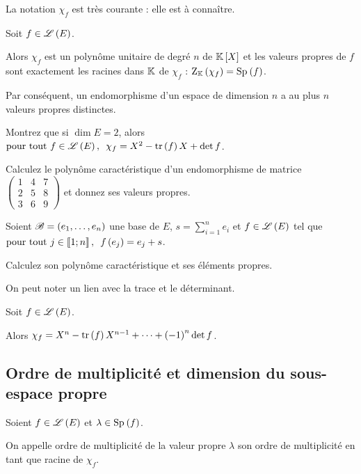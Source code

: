 La notation \(\chi_f\) est très courante : elle est à connaître.

\begin{theo}
Soit \(f\in\mathscr{L}\left(E\right)\).

Alors \(\chi_f\) est un polynôme unitaire de degré \(n\) de \(\poly\) et les valeurs propres de \(f\) sont exactement les racines dans \(\mathbb{K}\) de \(\chi_f\) : \(\rac{\chi_f}=\Sp{f}\).

Par conséquent, un endomorphisme d'un espace de dimension \(n\) a au plus \(n\) valeurs propres distinctes.
\end{theo}

\begin{exo}
Montrez que si \(\dim E=2\), alors \(\quantifs{\tpt f\in\Lendo{E}}\chi_f=X^2-\tr\paren{f}X+\det f\).
\end{exo}

\begin{exo}
Calculez le polynôme caractéristique d'un endomorphisme de matrice \(\begin{pmatrix}
1 & 4 & 7 \\
2 & 5 & 8 \\
3 & 6 & 9
\end{pmatrix}\) et donnez ses valeurs propres.
\end{exo}

\begin{exo}
Soient \(\mathscr{B}=\left(e_1,\dots,e_n\right)\) une base de \(E\), \(s=\sum_{i=1}^ne_i\) et \(f\in\mathscr{L}\left(E\right)\) tel que \(\quantifs{\tpt j\in\interventierii{1}{n}}f\paren{e_j}=e_j+s\).

Calculez son polynôme caractéristique et ses éléments propres.
\end{exo}

On peut noter un lien avec la trace et le déterminant.

\begin{prop}
Soit \(f\in\mathscr{L}\left(E\right)\).

Alors \(\chi_f=X^n-\operatorname{tr}\left(f\right)X^{n-1}+\dots+\left(-1\right)^n\det f\).
\end{prop}

\subsection{Ordre de multiplicité et dimension du sous-espace propre}

\begin{defi}
Soient \(f\in\mathscr{L}\left(E\right)\) et \(\lambda\in\Sp{f}\).

On appelle ordre de multiplicité de la valeur propre \(\lambda\) son ordre de multiplicité en tant que racine de \(\chi_f\).
\end{defi}


